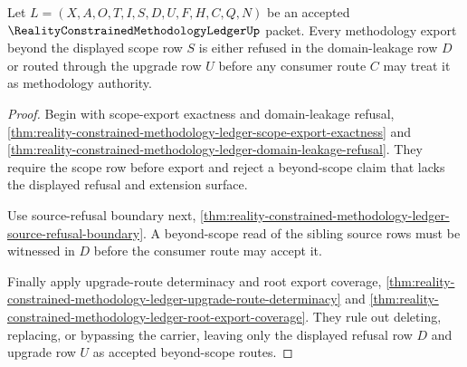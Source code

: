 \begin{theorem}
\label{thm:reality-constrained-methodology-ledger-upgrade-refusal-totality}
Let $L=(X,A,O,T,I,S,D,U,F,H,C,Q,N)$ be an accepted
$\RealityConstrainedMethodologyLedgerUp$ packet. Every methodology export
beyond the displayed scope row $S$ is either refused in the domain-leakage row
$D$ or routed through the upgrade row $U$ before any consumer route $C$ may
treat it as methodology authority.
\end{theorem}
\begin{proof}
Begin with scope-export exactness and domain-leakage refusal,
\autoref{thm:reality-constrained-methodology-ledger-scope-export-exactness}
and
\autoref{thm:reality-constrained-methodology-ledger-domain-leakage-refusal}.
They require the scope row before export and reject a beyond-scope claim that
lacks the displayed refusal and extension surface.

Use source-refusal boundary next,
\autoref{thm:reality-constrained-methodology-ledger-source-refusal-boundary}.
A beyond-scope read of the sibling source rows must be witnessed in $D$ before
the consumer route may accept it.

Finally apply upgrade-route determinacy and root export coverage,
\autoref{thm:reality-constrained-methodology-ledger-upgrade-route-determinacy}
and
\autoref{thm:reality-constrained-methodology-ledger-root-export-coverage}.
They rule out deleting, replacing, or bypassing the carrier, leaving only the
displayed refusal row $D$ and upgrade row $U$ as accepted beyond-scope routes.
\end{proof}

